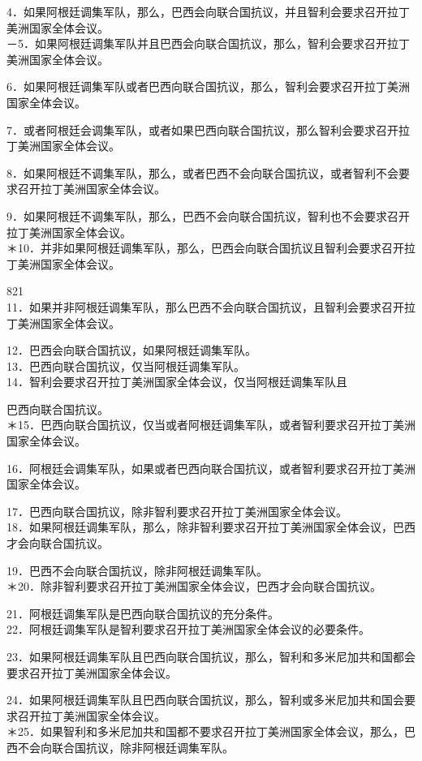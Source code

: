 4．如果阿根廷调集军队，那么，巴西会向联合国抗议，并且智利会要求召开拉丁美洲国家全体会议。\\
－5．如果阿根廷调集军队并且巴西会向联合国抗议，那么，智利会要求召开拉丁美洲国家全体会议。

6．如果阿根廷调集军队或者巴西向联合国抗议，那么，智利会要求召开拉丁美洲国家全体会议。

7．或者阿根廷会调集军队，或者如果巴西向联合国抗议，那么智利会要求召开拉丁美洲国家全体会议。

8．如果阿根廷不调集军队，那么，或者巴西不会向联合国抗议，或者智利不会要求召开拉丁美洲国家全体会议。

9．如果阿根廷不调集军队，那么，巴西不会向联合国抗议，智利也不会要求召开拉丁美洲国家全体会议。\\
＊10．并非如果阿根廷调集军队，那么，巴西会向联合国抗议且智利会要求召开拉丁美洲国家全体会议。

821\\
11．如果并非阿根廷调集军队，那么巴西不会向联合国抗议，且智利会要求召开拉丁美洲国家全体会议。

12．巴西会向联合国抗议，如果阿根廷调集军队。\\
13．巴西向联合国抗议，仅当阿根廷调集军队。\\
14．智利会要求召开拉丁美洲国家全体会议，仅当阿根廷调集军队且

巴西向联合国抗议。\\
＊15．巴西向联合国抗议，仅当或者阿根廷调集军队，或者智利要求召开拉丁美洲国家全体会议。

16．阿根廷会调集军队，如果或者巴西向联合国抗议，或者智利要求召开拉丁美洲国家全体会议。

17．巴西向联合国抗议，除非智利要求召开拉丁美洲国家全体会议。\\
18．如果阿根廷调集军队，那么，除非智利要求召开拉丁美洲国家全体会议，巴西才会向联合国抗议。

19．巴西不会向联合国抗议，除非阿根廷调集军队。\\
＊20．除非智利要求召开拉丁美洲国家全体会议，巴西才会向联合国抗议。

21．阿根廷调集军队是巴西向联合国抗议的充分条件。\\
22．阿根廷调集军队是智利要求召开拉丁美洲国家全体会议的必要条件。

23．如果阿根廷调集军队且巴西向联合国抗议，那么，智利和多米尼加共和国都会要求召开拉丁美洲国家全体会议。

24．如果阿根廷调集军队且巴西向联合国抗议，那么，智利或多米尼加共和国会要求召开拉丁美洲国家全体会议。\\
＊25．如果智利和多米尼加共和国都不要求召开拉丁美洲国家全体会议，那么，巴西不会向联合国抗议，除非阿根廷调集军队。

